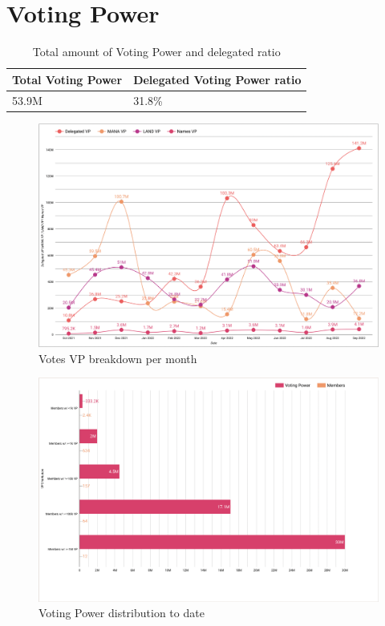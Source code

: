 \documentclass[MSE,Master,english]{twbook}%
\begin{document}
\section{Voting Power}
\begin{center}
  \begin{table}[H]
    \begin{tabular}{ | m{20em} | m{20em} | }
      \hline
      \textbf{Total Voting Power} & \textbf{Delegated Voting Power ratio} \\
      \hline
      53.9M & 31.8\% \\
      \hline
    \end{tabular}
    \caption{Total amount of Voting Power and delegated ratio}
    \label{table:VP}
  \end{table}
\end{center}
\begin{figure}[H]
  \centering
  \includegraphics[width=\textwidth]{metrics/votes_breakdown.png}
  \caption{Votes VP breakdown per month}
  \label{fig:votes_vp}
\end{figure}
\begin{figure}[H]
  \centering
  \includegraphics[width=\textwidth]{metrics/vp_distribution.png}
  \caption{Voting Power distribution to date}
  \label{fig:vp_distribution}
\end{figure}
\end{document}
